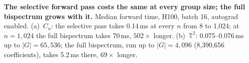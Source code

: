 \caption{\textbf{The selective forward pass costs the same at every group size; the full
    bispectrum grows with it.} Median forward time, H100, batch 16, autograd enabled.
    (a)~$C_n$: the selective pass takes 0.14\,ms at every $n$ from 8 to
    1{,}024; at $n{=}1{,}024$ the full bispectrum
    takes 70\,ms, $502\times$ longer.
    (b)~$\mathbb{T}^2$: 0.075--0.076\,ms up to $|G|{=}65{,}536$; the full
    bispectrum, run up to $|G|{=}4{,}096$ (8{,}390{,}656 coefficients),
    takes 5.2\,ms there, $69\times$ longer.}
  \label{fig:forward-timing}
